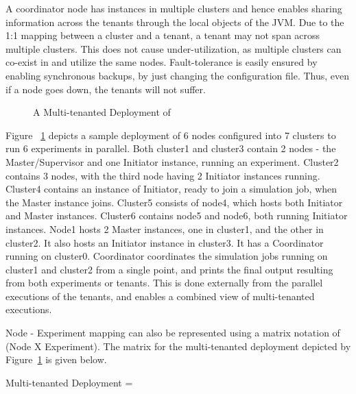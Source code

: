 A coordinator node has instances in multiple clusters and hence enables sharing information across the tenants through the local objects of the JVM. Due to the 1:1 mapping between a cluster and a tenant, a tenant may not span across multiple clusters. This does not cause under-utilization, as multiple clusters can co-exist in and utilize the same nodes. Fault-tolerance is easily ensured by enabling synchronous backups, by just changing the configuration file. Thus, even if a node goes down, the tenants will not suffer.
\begin{figure}[ht]
\begin{center}
\end{center}
 \caption{A Multi-tenanted Deployment of }
 \label{fig:mapreducecluster}
\end{figure}

Figure ~\ref{fig:mapreducecluster} depicts a sample deployment of 6 nodes configured into 7 clusters to run 6 experiments in parallel. Both cluster1 and cluster3 contain 2 nodes - the Master/Supervisor and one Initiator instance, running an experiment. Cluster2 contains 3 nodes, with the third node having 2 Initiator instances running. Cluster4 contains an instance of Initiator, ready to join a simulation job, when the Master instance joins. Cluster5 consists of node4, which hosts both Initiator and Master instances. Cluster6 contains node5 and node6, both running Initiator instances. Node1 hosts 2 Master instances, one in cluster1, and the other in cluster2. It also hosts an Initiator instance in cluster3. It has a Coordinator running on cluster0. Coordinator coordinates the simulation jobs running on cluster1 and cluster2 from a single point, and prints the final output resulting from both experiments or tenants. This is done externally from the parallel executions of the tenants, and enables a combined view of multi-tenanted executions.

Node - Experiment mapping can also be represented using a matrix notation of (Node X Experiment). The matrix for the multi-tenanted deployment depicted by Figure~\ref{fig:mapreducecluster} is given below.

Multi-tenanted Deployment =

